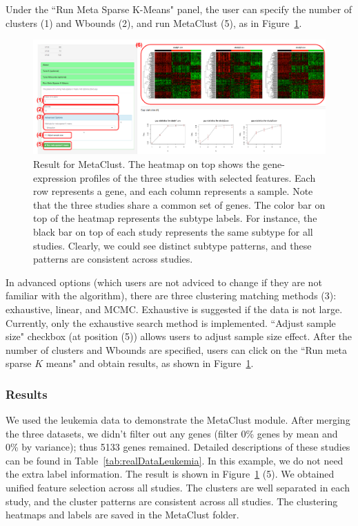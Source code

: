 \begin{steps}
Under the ``Run Meta Sparse K-Means" panel,
the user can specify the number of clusters {\color{red} (1)} and Wbounds {\color{red} (2)}, and run MetaClust {\color{red} (5)}, 
as in Figure~\ref{fig:mskmRes}.
\begin{figure}[H]
\begin{center}
\includegraphics[scale=0.5]{./figure/metaClust/mskmRes.pdf}
\caption{Result for MetaClust.
The heatmap on top shows the gene-expression profiles of the three studies with selected features.
Each row represents a gene, and each column represents a sample.
Note that the three studies share a common set of genes.
The color bar on top of the heatmap represents the subtype labels.
For instance, the black bar on top of each study represents the same subtype  for all studies.
Clearly, we could see distinct subtype patterns, and these patterns are consistent across studies.
}
\label{fig:mskmRes}
\end{center}
\end{figure}
In advanced options (which users are not adviced to change if they are not familiar with the algorithm), 
there are three clustering matching methods {\color{red} (3)}: exhaustive, linear, and MCMC.
Exhaustive is suggested if the data is not large.
Currently, only the exhaustive search method is implemented.
``Adjust sample size" checkbox (at position {\color{red} (5)}) allows users to adjust sample size effect.
After the number of clusters and Wbounds are specified,
users can click on the ``Run meta sparse $K$ means" and obtain results, 
as shown in Figure~\ref{fig:mskmRes}.
\end{steps}


\subsubsection{Results}

We used the leukemia data to demonstrate the MetaClust module.
After merging the three datasets, we didn't filter out any genes (filter 0\% genes by mean and 0\% by variance); 
thus 5133 genes remained.
Detailed descriptions of these studies can be found in Table~\ref{tab:realDataLeukemia}. 
In this example, we do not need the extra label information.
The result is shown in Figure~\ref{fig:mskmRes} {\color{red} (5)}.
We obtained unified feature selection across all studies.
The clusters are well separated in each study, and the cluster patterns are consistent across all studies.
The clustering heatmaps and labels are saved in the MetaClust folder.










